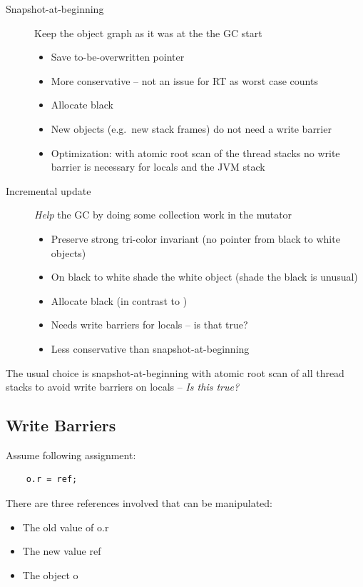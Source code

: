 \begin{description}
    \item[Snapshot-at-beginning] Keep the object graph as it was at
    the the GC start
    \begin{itemize}
        \item Save to-be-overwritten pointer
        \item More conservative -- not an issue for RT as worst case
        counts
        \item Allocate black
        \item New objects (e.g.\ new stack frames) do not need a
        write barrier
        \item Optimization: with atomic root scan of the thread
        stacks no write barrier is necessary for locals and the JVM
        stack
    \end{itemize}
    \item[Incremental update] \emph{Help} the GC by doing some collection
    work in the mutator
    \begin{itemize}
        \item Preserve strong tri-color invariant (no pointer from
        black to white objects)
        \item On black to white shade the white object (shade the
        black is unusual)
        \item Allocate black (in contrast to \cite{gc:dijkstra78})
        \item Needs write barriers for locals -- is that true?
        \item Less conservative than snapshot-at-beginning
    \end{itemize}
\end{description}

The usual choice is snapshot-at-beginning with atomic root scan of
all thread stacks to avoid write barriers on locals -- \emph{Is this
true?}

\subsection{Write Barriers}

Assume following assignment:

\begin{verbatim}
    o.r = ref;
\end{verbatim}

There are three references involved that can be manipulated:
\begin{itemize}
    \item The old value of o.r
    \item The new value ref
    \item The object o
\end{itemize}

